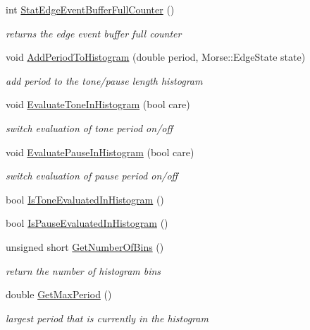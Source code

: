 \begin{DoxyCompactItemize}
int \hyperlink{classMorseStatistic_a92064ea196420fa75a5950a8bdab874e}{Stat\+Edge\+Event\+Buffer\+Full\+Counter} ()
\begin{DoxyCompactList}\small\item\em returns the edge event buffer full counter \end{DoxyCompactList}\item 
void \hyperlink{classMorseStatistic_addefc50d54ca28297ad4ebb50488601d}{Add\+Period\+To\+Histogram} (double period, Morse\+::\+Edge\+State state)
\begin{DoxyCompactList}\small\item\em add period to the tone/pause length histogram \end{DoxyCompactList}\item 
void \hyperlink{classMorseStatistic_a6ba988ce121e1f99cff841f5db6265f8}{Evaluate\+Tone\+In\+Histogram} (bool care)
\begin{DoxyCompactList}\small\item\em switch evaluation of tone period on/off \end{DoxyCompactList}\item 
void \hyperlink{classMorseStatistic_aabfa04ea2d9664fd2d2434698243bbae}{Evaluate\+Pause\+In\+Histogram} (bool care)
\begin{DoxyCompactList}\small\item\em switch evaluation of pause period on/off \end{DoxyCompactList}\item 
bool \hyperlink{classMorseStatistic_ad2f9a6c81583599830803c8024abc507}{Is\+Tone\+Evaluated\+In\+Histogram} ()
\item 
bool \hyperlink{classMorseStatistic_a79840d18d8976b85931f150df0a94e11}{Is\+Pause\+Evaluated\+In\+Histogram} ()
\item 
unsigned short \hyperlink{classMorseStatistic_a7f74b33235ac1c347aa35c778914ca91}{Get\+Number\+Of\+Bins} ()
\begin{DoxyCompactList}\small\item\em return the number of histogram bins \end{DoxyCompactList}\item 
double \hyperlink{classMorseStatistic_a4e421283bff64677db975e258f5c26d6}{Get\+Max\+Period} ()
\begin{DoxyCompactList}\small\item\em largest period that is currently in the histogram \end{DoxyCompactList}\item 

\end{DoxyCompactItemize}
